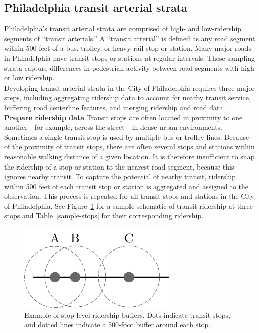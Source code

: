 \documentclass[paper=letterpaper, fontsize=11pt]{scrartcl}
\begin{document}
\subsection{Philadelphia transit arterial strata}
Philadelphia's transit arterial strata are comprised of high- and low-ridership segments of ``transit arterials.'' A ``transit arterial'' is defined as any road segment within 500 feet of a bus, trolley, or heavy rail stop or station. Many major roads in Philadelphia have transit stops or stations at regular intervals. These sampling strata capture differences in pedestrian activity between road segments with high or low ridership. \\

Developing transit arterial strata in the City of Philadelphia requires three major steps, including aggregating ridership data to account for nearby transit service, buffering road centerline features, and merging ridership and road data. \\

\textbf{Prepare ridership data}
Transit stops are often located in proximity to one another---for example, across the street---in dense urban environments. Sometimes a single transit stop is used by multiple bus or trolley lines. Because of the proximity of transit stops, there are often several stops and stations within reasonable walking distance of a given location. It is therefore insufficient to snap the ridership of a stop or station to the nearest road segment, because this ignores nearby transit. To capture the potential of nearby transit, ridership within 500 feet of each transit stop or station is aggregated and assigned to the observation. This process is repeated for all transit stops and stations in the City of Philadelphia. See Figure~\ref{stops} for a sample schematic of transit ridership at three stops and Table~\ref{sample-stops} for their corresponding ridership. \\

\begin{figure}[!htbp]
	\centering
	\includegraphics[width=3in]{stopdiag.png}
	\caption{Example of stop-level ridership buffers. Dots indicate transit stops, and dotted lines indicate a 500-foot buffer around each stop.} \label{stops}
\end{figure}
\end{document}
